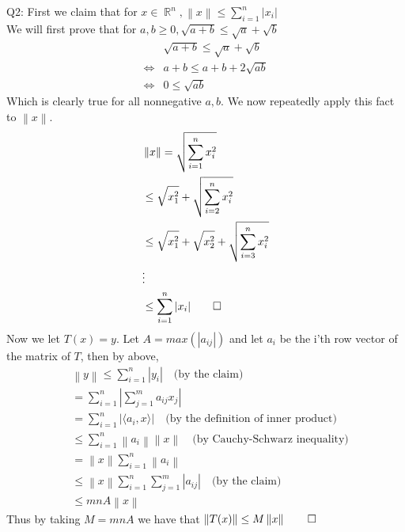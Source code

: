 \documentclass[letterpaper]{article}
\DeclareMathOperator{\R}{\mathbb{R}}
\newcommand{\lan}{\langle}
\newcommand{\ran}{\rangle}
\newcommand{\norm}[1]{\left\lVert#1\right\rVert}
\newcommand{\inn}[1]{\lan#1\ran}
\begin{document}
Q2: \newline
First we claim that for $x \in \R^n, \norm{x} \leq \sum_{i=1}^n |x_i|$ \\
We will first prove that for $a,b \geq 0,  \sqrt{a+b} \leq \sqrt{a} + \sqrt{b}$
\begin{align*}
   & \sqrt{a+b} \leq \sqrt{a} + \sqrt{b}
   \\ \iff &  a+b \leq a+b + 2 \sqrt{ab}
   \\ \iff & 0 \leq \sqrt{ab}
\end{align*}
Which is clearly true for all nonnegative $a,b$. We now repeatedly apply this fact to $\norm{x}$. 
\begin{align*}
   & \norm{x} = \sqrt{\sum_{i=1}^n x_i^2} 
   \\ & \leq \sqrt{x_1 ^2} + \sqrt{\sum_{i=2}^n x_i^2}   
   \\ & \leq \sqrt{x_1^2} + \sqrt{x_2^2} + \sqrt{\sum_{i=3}^n x_i^2}
   \\ & \vdots
   \\ & \leq \sum_{i=1}^n |x_i| \qed
\end{align*}
Now we let $T(x)=y$. Let $A= max(|a_{ij}|)$ and let $a_i$ be the i'th row vector of the matrix of $T$, then by above, 
\begin{align*}
    & \norm{y} \leq \sum_{i=1}^n |y_i| \quad \text{(by the claim)}
    \\ & =\sum_{i=1}^n |\sum_{j=1}^m a_{ij} x_j|
    \\ & = \sum_{i=1}^n |\inn{a_i,x}| \quad \text{(by the definition of inner product)}
    \\ & \leq \sum_{i=1}^n \norm{a_i} \norm{x} \quad \text{(by Cauchy-Schwarz inequality)}
    \\ & = \norm{x} \sum_{i=1}^n \norm{a_i}
    \\ & \leq \norm{x} \sum_{i=1}^n \sum_{j=1}^m |a_{ij}| \quad \text{(by the claim)}
    \\ & \leq mnA \norm{x}
\end{align*}
Thus by taking $M=mnA$ we have that $\norm{T(x)} \leq M \norm{x} \qed$
\end{document}
